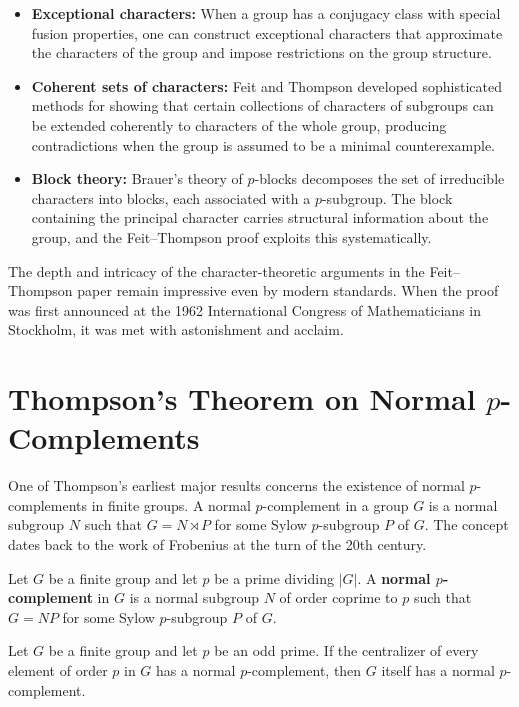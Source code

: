 \begin{itemize}
\item \textbf{Exceptional characters:} When a group has a conjugacy class with special fusion properties, one can construct exceptional characters that approximate the characters of the group and impose restrictions on the group structure.

\item \textbf{Coherent sets of characters:} Feit and Thompson developed sophisticated methods for showing that certain collections of characters of subgroups can be extended coherently to characters of the whole group, producing contradictions when the group is assumed to be a minimal counterexample.

\item \textbf{Block theory:} Brauer's theory of \(p\)-blocks decomposes the set of irreducible characters into blocks, each associated with a \(p\)-subgroup. The block containing the principal character carries structural information about the group, and the Feit--Thompson proof exploits this systematically.
\end{itemize}

The depth and intricacy of the character-theoretic arguments in the Feit--Thompson paper remain impressive even by modern standards. When the proof was first announced at the 1962 International Congress of Mathematicians in Stockholm, it was met with astonishment and acclaim.

\section{Thompson's Theorem on Normal \texorpdfstring{\(p\)}{p}-Complements}

One of Thompson's earliest major results concerns the existence of normal \(p\)-complements in finite groups. A normal \(p\)-complement in a group \(G\) is a normal subgroup \(N\) such that \(G = N \rtimes P\) for some Sylow \(p\)-subgroup \(P\) of \(G\). The concept dates back to the work of Frobenius at the turn of the 20th century.

\begin{definition}
Let \(G\) be a finite group and let \(p\) be a prime dividing \(|G|\). A \textbf{normal \(p\)-complement} in \(G\) is a normal subgroup \(N\) of order coprime to \(p\) such that \(G = NP\) for some Sylow \(p\)-subgroup \(P\) of \(G\).
\end{definition}

\begin{theorem}[Thompson, 1960]
Let \(G\) be a finite group and let \(p\) be an odd prime. If the centralizer of every element of order \(p\) in \(G\) has a normal \(p\)-complement, then \(G\) itself has a normal \(p\)-complement.
\end{theorem}

